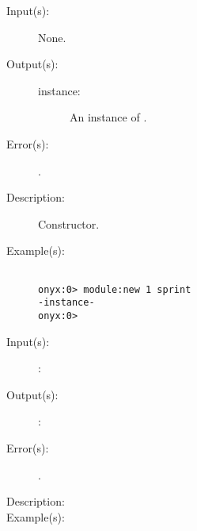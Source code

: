 \begin{description}
\begin{description}
\begin{verbatim}
		\end{verbatim}
	\end{description}
\label{module:new}
\item[{\onyxop{--}{new}{instance}}: ]
	\begin{description}\item[]
	\item[Input(s): ] None.
	\item[Output(s): ]
		\begin{description}\item[]
		\item[instance: ]
			An instance of .
		\end{description}
	\item[Error(s): ]
		\begin{description}\item[]
		\item[.]
		\end{description}
	\item[Description: ]
		Constructor.
	\item[Example(s): ]\begin{verbatim}

onyx:0> module:new 1 sprint
-instance-
onyx:0>
		\end{verbatim}
	\end{description}
\label{module:post_unload_hook_set}
\item[{\onyxop{METHODINS}{post\_unload\_hook\_set}{METHODOUTS}}: ]
	\begin{description}\item[]
	\item[Input(s): ]
		\begin{description}\item[]
		\item[: ]
		\end{description}
	\item[Output(s): ]
		\begin{description}\item[]
		\item[: ]
		\end{description}
	\item[Error(s): ]
		\begin{description}\item[]
		\item[.]
		\end{description}
	\item[Description: ]
	\item[Example(s): ]\begin{verbatim}


\end{verbatim}
\end{description}
\end{description}
